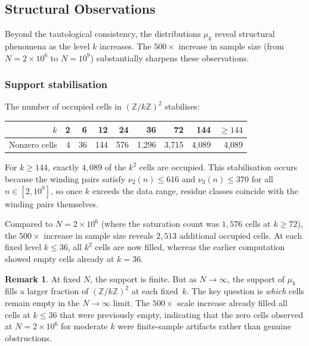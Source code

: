 \documentclass[11pt,a4paper]{article}
\newcommand{\Z}{\mathbb{Z}}
\theoremstyle{plain}
\theoremstyle{definition}
\newtheorem{remark}[theorem]{Remark}
\begin{document}
\subsection{Structural Observations}

Beyond the tautological consistency, the distributions $\mu_k$ reveal
structural phenomena as the level $k$ increases.  The $500\times$
increase in sample size (from $N = 2 \times 10^6$ to $N = 10^9$)
substantially sharpens these observations.

\subsubsection{Support stabilisation}

\begin{empirical}
\label{obs:support-stab}
    The number of occupied cells in $(\Z/k\Z)^2$ stabilises:
    \begin{center}
    \renewcommand{\arraystretch}{1.15}
    \begin{tabular}{rrrrrrrrr}
        \toprule
        $k$ & 2 & 6 & 12 & 24 & 36 & 72 & 144 & $\geq 144$ \\
        \midrule
        Nonzero cells & 4 & 36 & 144 & 576 & 1{,}296 & 3{,}715
                      & 4{,}089 & 4{,}089 \\
        \bottomrule
    \end{tabular}
    \end{center}
    For $k \geq 144$, exactly $4{,}089$ of the $k^2$ cells are
    occupied.  This stabilisation occurs because the winding pairs
    satisfy $\nu_2(n) \leq 616$ and $\nu_3(n) \leq 370$ for all
    $n \in [2, 10^9]$, so once $k$ exceeds the data range, residue
    classes coincide with the winding pairs themselves.

    Compared to $N = 2 \times 10^6$ (where the saturation count was
    $1{,}576$ cells at $k \geq 72$), the $500\times$ increase in
    sample size reveals $2{,}513$ additional occupied cells.  At each
    fixed level $k \leq 36$, all $k^2$ cells are now filled, whereas
    the earlier computation showed empty cells already at $k = 36$.
\end{empirical}

\begin{remark}
    At fixed $N$, the support is finite.  But as $N \to \infty$, the
    support of $\mu_k$ fills a larger fraction of $(\Z/k\Z)^2$ at
    each fixed~$k$.  The key question is \emph{which} cells remain
    empty in the $N \to \infty$ limit.  The $500\times$ scale
    increase already filled all cells at $k \leq 36$ that were
    previously empty, indicating that the zero cells observed at
    $N = 2 \times 10^6$ for moderate $k$ were finite-sample artifacts
    rather than genuine obstructions.
\end{remark}
\end{document}
